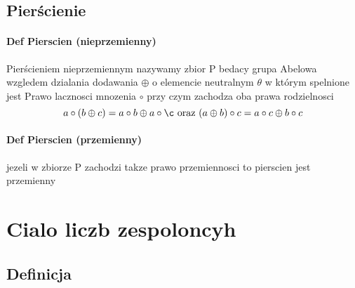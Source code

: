 \documentclass[a4paper]{article}
\begin{document}
\subsection{Pierścienie}
\paragraph{Def Pierscien (nieprzemienny)}
Pierścieniem nieprzemiennym nazywamy zbior P bedacy grupa Abelowa wzgledem dzialania dodawania $\oplus$ o elemencie neutralnym $\theta$ w którym spelnione jest Prawo lacznosci mnozenia $\circ$ przy czym zachodza oba prawa rodzielnosci
\begin{equation}
    a \circ (b \oplus c) = a \circ b \oplus a \circ \c \ \text{oraz} \ (a \oplus b) \circ c = a \circ c \oplus b \circ c
\end{equation}
\paragraph{Def Pierscien (przemienny)}
jezeli w zbiorze P zachodzi takze prawo przemiennosci to pierscien jest przemienny
\section{Cialo liczb zespoloncyh}
\subsection{Definicja}
\end{document}
